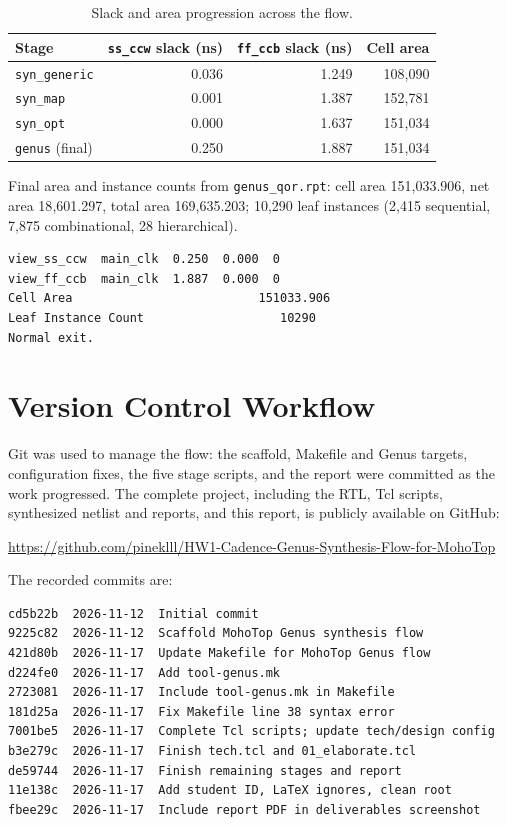 \documentclass[11pt]{article}
\begin{document}
\begin{table}[H]
\centering
\small
\caption{Slack and area progression across the flow.}
\label{tab:progress}
\begin{tabular}{@{}lrrr@{}}
\toprule
Stage & \texttt{ss\_ccw} slack (ns) & \texttt{ff\_ccb} slack (ns) & Cell area \\
\midrule
\texttt{syn\_generic} & 0.036 & 1.249 & 108{,}090 \\
\texttt{syn\_map} & 0.001 & 1.387 & 152{,}781 \\
\texttt{syn\_opt} & 0.000 & 1.637 & 151{,}034 \\
\texttt{genus} (final) & 0.250 & 1.887 & 151{,}034 \\
\bottomrule
\end{tabular}
\end{table}

Final area and instance counts from \texttt{genus\_qor.rpt}: cell area
151{,}033.906, net area 18{,}601.297, total area 169{,}635.203; 10{,}290 leaf
instances (2{,}415 sequential, 7{,}875 combinational, 28 hierarchical).

\begin{verbatim}
view_ss_ccw  main_clk  0.250  0.000  0
view_ff_ccb  main_clk  1.887  0.000  0
Cell Area                          151033.906
Leaf Instance Count                   10290
Normal exit.
\end{verbatim}

\section{Version Control Workflow}

Git was used to manage the flow: the scaffold, Makefile and Genus targets,
configuration fixes, the five stage scripts, and the report were committed as
the work progressed. The complete project, including the RTL, Tcl scripts,
synthesized netlist and reports, and this report, is publicly available on
GitHub:

\begin{center}
\url{https://github.com/pineklll/HW1-Cadence-Genus-Synthesis-Flow-for-MohoTop}
\end{center}

The recorded commits are:

{\footnotesize
\begin{verbatim}
cd5b22b  2026-11-12  Initial commit
9225c82  2026-11-12  Scaffold MohoTop Genus synthesis flow
421d80b  2026-11-17  Update Makefile for MohoTop Genus flow
d224fe0  2026-11-17  Add tool-genus.mk
2723081  2026-11-17  Include tool-genus.mk in Makefile
181d25a  2026-11-17  Fix Makefile line 38 syntax error
7001be5  2026-11-17  Complete Tcl scripts; update tech/design config
b3e279c  2026-11-17  Finish tech.tcl and 01_elaborate.tcl
de59744  2026-11-17  Finish remaining stages and report
11e138c  2026-11-17  Add student ID, LaTeX ignores, clean root
fbee29c  2026-11-17  Include report PDF in deliverables screenshot
\end{verbatim}
}
\end{document}
